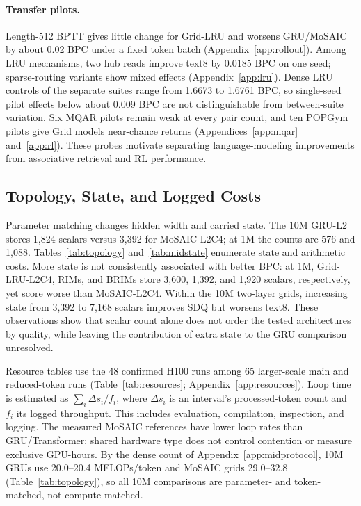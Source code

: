 \documentclass[letterpaper,twoside]{article}
\begin{document}
\paragraph{Transfer pilots.}
Length-512 BPTT gives little change for Grid-LRU and worsens GRU/MoSAIC by about 0.02 BPC under a fixed token batch (Appendix~\ref{app:rollout}). Among LRU mechanisms, two hub reads improve text8 by 0.0185 BPC on one seed; sparse-routing variants show mixed effects (Appendix~\ref{app:lru}). Dense LRU controls of the separate suites range from 1.6673 to 1.6761 BPC, so single-seed pilot effects below about 0.009 BPC are not distinguishable from between-suite variation. Six MQAR pilots remain weak at every pair count, and ten POPGym pilots give Grid models near-chance returns (Appendices~\ref{app:mqar} and~\ref{app:rl}). These probes motivate separating language-modeling improvements from associative retrieval and RL performance.



\subsection{Topology, State, and Logged Costs}\label{sec:resources}

Parameter matching changes hidden width and carried state. The 10M GRU-L2 stores 1,824 scalars versus 3,392 for MoSAIC-L2C4; at 1M the counts are 576 and 1,088. Tables~\ref{tab:topology} and~\ref{tab:midstate} enumerate state and arithmetic costs. More state is not consistently associated with better BPC: at 1M, Grid-LRU-L2C4, RIMs, and BRIMs store 3,600, 1,392, and 1,920 scalars, respectively, yet score worse than MoSAIC-L2C4. Within the 10M two-layer grids, increasing state from 3,392 to 7,168 scalars improves SDQ but worsens text8. These observations show that scalar count alone does not order the tested architectures by quality, while leaving the contribution of extra state to the GRU comparison unresolved.

Resource tables use the 48 confirmed H100 runs among 65 larger-scale main and reduced-token runs (Table~\ref{tab:resources}; Appendix~\ref{app:resources}). Loop time is estimated as $\sum_i\Delta s_i/f_i$, where $\Delta s_i$ is an interval's processed-token count and $f_i$ its logged throughput. This includes evaluation, compilation, inspection, and logging. The measured MoSAIC references have lower loop rates than GRU/Transformer; shared hardware type does not control contention or measure exclusive GPU-hours. By the dense count of Appendix~\ref{app:midprotocol}, 10M GRUs use 20.0--20.4 MFLOPs/token and MoSAIC grids 29.0--32.8 (Table~\ref{tab:topology}), so all 10M comparisons are parameter- and token-matched, not compute-matched.
\end{document}
